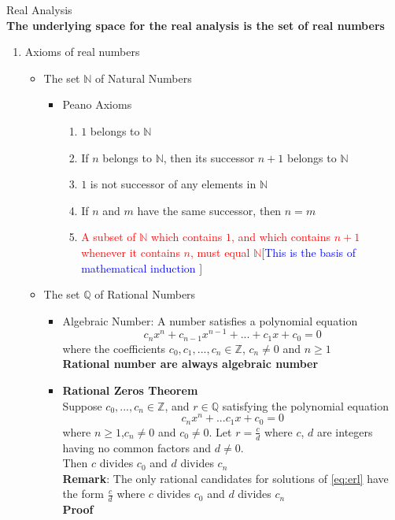 \documentclass[12pt]{article}
\begin{document}
{\LARGE Real Analysis}\\
\textbf{The underlying space for the real analysis is the set of real numbers}
\begin{enumerate}
\item {\large Axioms of real numbers}	
	\begin{itemize}
	\item The set $\mathbb{N}$ of Natural Numbers
		\begin{itemize}
		\item Peano Axioms
			\begin{enumerate}
			\item $1$ belongs to $\mathbb{N}$
			\item If $n$ belongs to $\mathbb{N}$, then its successor $n+1$ belongs to $\mathbb{N}$
			\item $1$ is not successor of any elements in $\mathbb{N}$
			\item If $n$ and $m$ have the same successor, then $n=m$
			\item \textcolor{red}{A subset of $\mathbb{N}$ which contains $1$, and which contains $n+1$ whenever it contains $n$, must equal $\mathbb{N}$}[\textcolor{blue}{This is the basis of mathematical induction }]
			\end{enumerate}
		\end{itemize}
	\item The set $\mathbb{Q}$ of Rational Numbers
		\begin{itemize}
		\item Algebraic Number: A number satisfies a polynomial equation $$c_nx^n+c_{n-1}x^{n-1}+...+c_1x+c_0=0$$ where the coefficients $c_0, c_1,...,c_n \in \mathbb{Z}$, $c_n\not=0$ and $n\geq 1$\\
		\textbf{Rational number are always algebraic number}
		\item \textbf{Rational Zeros Theorem}\\
		Suppose $c_0,...,c_n\in \mathbb{Z}$, and $r\in \mathbb{Q}$ satisfying the polynomial equation
		\begin{equation}\label{eq:erl}
		c_nx^n+...c_1x+c_0=0
\end{equation}		
	where $n\geq 1$,$c_n\not=0$ and $c_0\not=0$. Let $r=\frac{c}{d}$ where $c$, $d$ are integers having no common factors and $d\not=0$. \\Then $c$ divides $c_0$ and $d$ divides $c_n$\\ \textbf{Remark}: The only rational candidates for solutions of \eqref{eq:erl} have the form $\frac{c}{d}$ where $c$ divides $c_0$ and $d$ divides $c_n$	
		\\  \textbf{Proof}\\
		

\end{itemize}
\end{itemize}
\end{enumerate}
\end{document}
